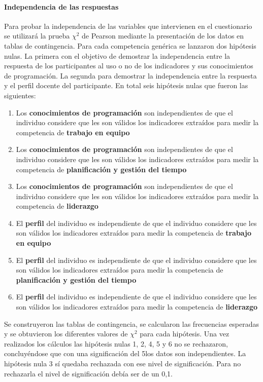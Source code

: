 \paragraph{Independencia de las respuestas}

Para probar la independencia de las variables que intervienen en el cuestionario se utilizará la prueba $\chi^2$ de Pearson mediante la presentación de los datos en tablas de contingencia. Para cada competencia genérica se lanzaron dos hipótesis nulas. La primera con el objetivo de demostrar la independencia entre la respuesta de los participantes al uso o no de los indicadores y sus conocimientos de programación. La segunda para demostrar la independencia entre la respuesta y el perfil docente del participante. En total seis hipótesis nulas que fueron las siguientes:

\begin{enumerate}
\item Los \textbf{conocimientos de programación} son independientes de que el individuo considere que les son válidos los indicadores extraídos para medir la competencia de \textbf{trabajo en equipo}
\item Los \textbf{conocimientos de programación} son independientes de que el individuo considere que les son válidos los indicadores extraídos para medir la competencia de \textbf{planificación y gestión del tiempo}
\item Los \textbf{conocimientos de programación} son independientes de que el individuo considere que les son válidos los indicadores extraídos para medir la competencia de \textbf{liderazgo}
\item El \textbf{perfil} del individuo es independiente de que el individuo considere que les son válidos los indicadores extraídos para medir la competencia de \textbf{trabajo en equipo}
\item El \textbf{perfil} del individuo es independiente de que el individuo considere que les son válidos los indicadores extraídos para medir la competencia de \textbf{planificación y gestión del tiempo}
\item El \textbf{perfil} del individuo es independiente de que el individuo considere que les son válidos los indicadores extraídos para medir la competencia de \textbf{liderazgo}
\end{enumerate}

Se construyeron las tablas de contingencia, se calcularon las frecuencias esperadas y se obtuvieron los diferentes valores de $\chi^2$ para cada hipótesis. Una vez realizados los cálculos las hipótesis nulas 1, 2, 4, 5 y 6 no se rechazaron, concluyéndose que con una significación del 5\percentage los datos son independientes. La hipótesis nula 3 sí quedaba rechazada con ese nivel de significación. Para no rechazarla el nivel de significación debía ser de un 0,1\percentage.

